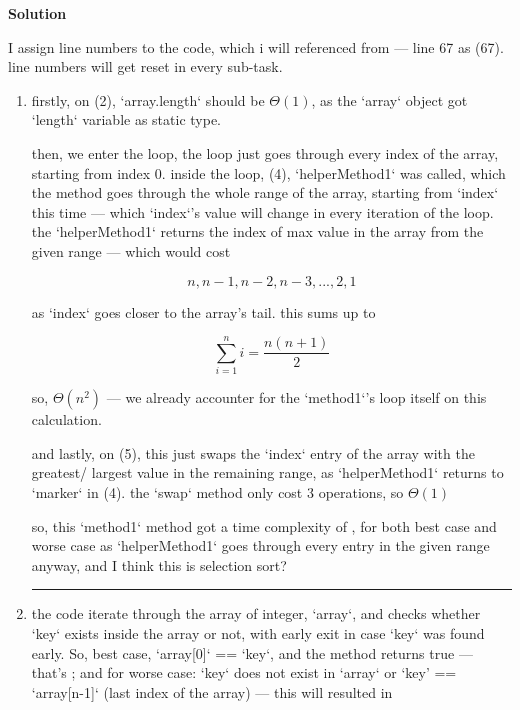 \documentclass{article}
\newcommand{\solution}{\textbf{\large Solution}}
\theoremstyle{remark}
\begin{document}
\medskip
\solution

\remark I assign line numbers to the code, which i will referenced from --- line 67 as (67). line numbers will get reset in every sub-task.

\begin{enumerate}
    \item firstly, on (2), `array.length` should be $\Theta(1)$, as the `array` object got `length` variable as static type. 

        \vspace{1em}

        then, we enter the loop, the loop just goes through every index of the array, starting from index 0. inside the loop, (4), `helperMethod1` was called, which the method goes through the whole range of the array, starting from `index` this time --- which `index`'s value will change in every iteration of the loop. the `helperMethod1` returns the index of max value in the array from the given range --- which would cost

        \[n, n-1, n-2, n-3, ..., 2, 1\]

        as `index` goes closer to the array's tail. this sums up to

        \[\sum_{i=1}^n i = \frac{n(n+1)}{2}\]

        so, $\Theta(n^2)$ --- we already accounter for the `method1`'s loop itself on this calculation. 

        and lastly, on (5), this just swaps the `index` entry of the array with the greatest/ largest value in the remaining range, as `helperMethod1` returns to `marker` in (4). the `swap` method only cost 3 operations, so $\Theta(1)$

        \vspace{1em}

        so, this `method1` method got a time complexity of , for both best case and worse case as `helperMethod1` goes through every entry in the given range anyway, and I think this is selection sort? 

    \medskip
    \begin{center}
    \rule{0.3\linewidth}{0.2pt}
    \end{center}
    \medskip

    \item the code iterate through the array of integer, `array`, and checks whether `key` exists inside the array or not, with early exit in case `key` was found early. So, best case, `array[0]` == `key`, and the method returns true --- that's ; and for worse case: `key` does not exist in `array` or `key' == `array[n-1]` (last index of the array) --- this will resulted in 


\end{enumerate}
\end{document}
